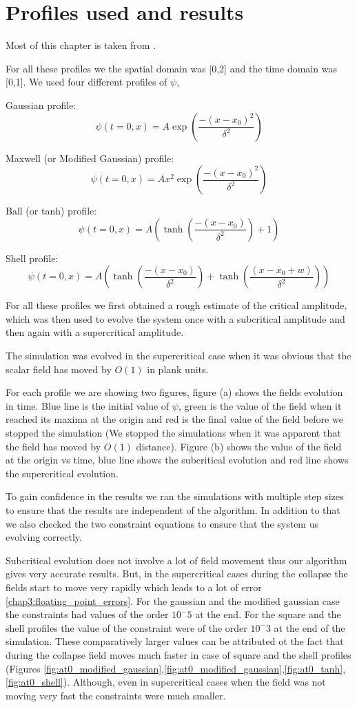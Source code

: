 \chapter{Profiles used and results}
Most of this chapter is taken from \citep{Chaudhary:2020yyv}.

For all these profiles we the spatial domain was [0,2] and the time domain was [0,1].
We used four different profiles of $\psi$,


Gaussian profile:
\[
    \psi(t=0, x)=A \exp \left(\frac{-\left(x-x_{0}\right)^{2}}{\delta^{2}}\right)
\]

Maxwell (or Modified Gaussian) profile:
\[
    \psi(t=0, x)=A x^{2} \exp \left(\frac{-\left(x-x_{0}\right)^{2}}{\delta^{2}}\right)
\]

Ball (or tanh) profile:
\[
    \psi(t=0, x)=A\left(\tanh \left(\frac{-\left(x-x_{0}\right)}{\delta^{2}}\right)+1\right)
\]

Shell profile:
\[
    \psi(t=0, x)=A\left(\tanh \left(\frac{-\left(x-x_{0}\right)}{\delta^{2}}\right)+\tanh \left(\frac{\left(x-x_{0}+w\right)}{\delta^{2}}\right)\right)
\]

For all these profiles we first obtained a rough estimate of the critical amplitude, which was then used to evolve the system once with a subcritical amplitude and then again with a supercritical amplitude.

The simulation was evolved in the supercritical case when it was obvious that the scalar field has moved by $O(1)$ in plank units.

For each profile we are showing two figures, figure (a) shows the fields evolution in time. Blue line is the initial value of $\psi$, green is the value of the field when it reached its maxima at the origin and red is the final value of the field before we stopped the simulation (We stopped the simulations when it was apparent that the field has moved by $O(1)$ distance). Figure (b) shows the value of the field at the origin vs time, blue line shows the subcritical evolution and red line shows the supercritical evolution.

To gain confidence in the results we ran the simulations with multiple step sizes to ensure that the results are independent of the algorithm. In addition to that we also checked the two constraint equations to ensure that the system us evolving correctly.

Subcritical evolution does not involve a lot of field movement thus our algorithm gives very accurate results. But, in the supercritical cases during the collapse the fields start to move very rapidly which leads to a lot of error \ref{chap3:floating_point_errors}.
For the gaussian and the modified gaussian case the constraints had values of the order $10^-5$ at the end.
For the square and the shell profiles the value of the constraint were of the order $10^-3$ at the end of the simulation. These comparatively larger values can be attributed ot the fact that during the collapse field moves much faster in case of square and the shell profiles (Figures \ref{fig:at0_modified_gaussian},\ref{fig:at0_modified_gaussian},\ref{fig:at0_tanh},\ref{fig:at0_shell}).
Although, even in supercritical cases when the field was not moving very fast the constraints were much smaller.

